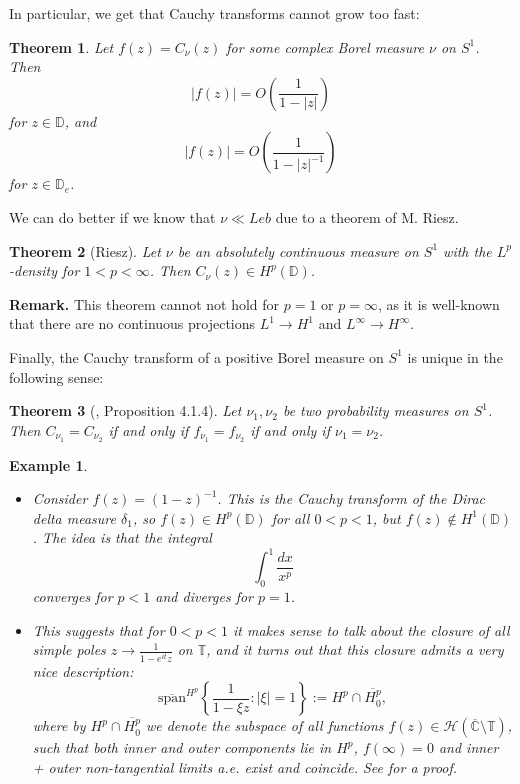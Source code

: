 \documentclass[11pt]{article}
\newtheorem{theorem}{Theorem}[section]
\newtheorem{example}{Example}[section]
\begin{document}
In particular, we get that Cauchy transforms cannot grow too fast:

\begin{theorem}
	\label{growth rates for Cauchy}
	Let $f(z) = C_\nu(z)$ for some complex Borel measure $\nu$ on $S^1$. Then
	\[
	|f(z)| = O\left( \frac{1}{1 - |z|} \right) 
	\]
	for $z \in \mathbb{D}$, and
	\[
	|f(z)| = O\left( \frac{1}{1 - |z|^{-1}} \right) 
	\]
	for $z \in \mathbb{D}_e$.
\end{theorem}

We can do better if we know that $\nu \ll Leb$ due to a theorem of M. Riesz.

\begin{theorem}[Riesz]
	\label{Cauchy of Lp}
	Let $\nu$ be an absolutely continuous measure on $S^1$ with the $L^p$-density for $1 < p < \infty$. Then $C_\nu(z) \in H^p(\mathbb{D})$.
\end{theorem}

\textbf{Remark.} This theorem cannot not hold for $p = 1$ or $p = \infty$, as it is well-known that there are no continuous projections $L^1 \rightarrow H^1$ and $L^\infty \rightarrow H^{\infty}.$

Finally, the Cauchy transform of a positive Borel measure on $S^1$ is unique in the following sense:

\begin{theorem}[\cite{book:738388}, Proposition 4.1.4]
	Let $\nu_1, \nu_2$ be two probability measures on $S^1$. \\ Then $C_{\nu_1} = C_{\nu_2}$ if and only if $f_{\nu_1} = f_{\nu_2}$ if and only if $\nu_1 = \nu_2$.
\end{theorem}

\begin{example}
	\indent
	\begin{itemize}
		\item Consider $f(z) = (1 - z)^{-1}$. This is the Cauchy transform of the Dirac delta measure $\delta_1$, so $f(z) \in H^p(\mathbb{D})$ for all $0 < p < 1$, but $f(z) \notin H^{1}(\mathbb{D})$. The idea is that the integral
		\[
		\int_{0}^1 \frac{dx}{x^p}
		\]
		converges for $p < 1$ and diverges for $p = 1$.
		\item This suggests that for $0 < p < 1$ it makes sense to talk about the closure of all simple poles $z \rightarrow \frac{1}{1 - e^{it}z}$ on $\mathbb{T}$, and it turns out that this closure admits a very nice description:
		\begin{equation}
			\overline{\text{span}}^{H^p} \left\lbrace \frac{1}{1 - \xi z} : |\xi| = 1 \right\rbrace := H^p \cap \overline{H^p_0},
		\end{equation}
		where by $H^p \cap \overline{H^p_0}$ we denote the subspace of all functions $f(z) \in \mathcal{H}(\overline{\mathbb{C}} \setminus \mathbb{T})$, such that both inner and outer components lie in $H^p$, $f(\infty) = 0$ and inner + outer non-tangential limits a.e. exist and coincide. See \cite{Ale79} for a proof.
	\end{itemize}
\end{example}
\end{document}
